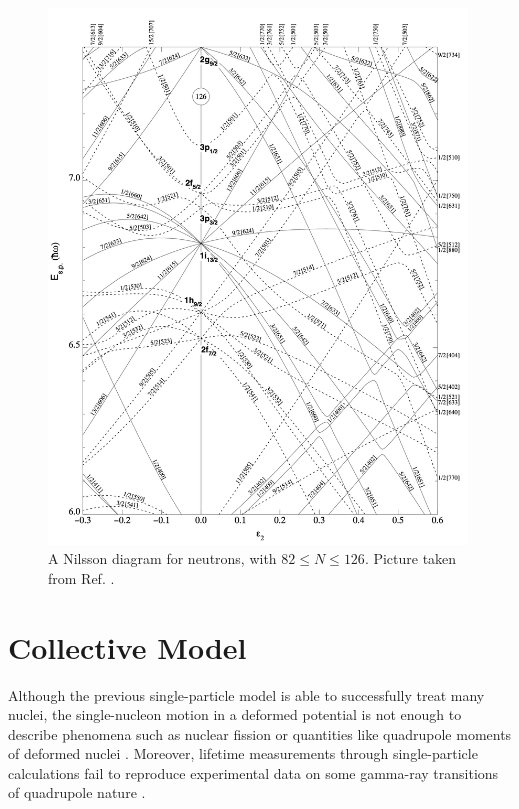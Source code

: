 \begin{figure}
    \centering
    \includegraphics[width=0.99\textwidth]{Chapters/Figures/nillson_diagram_2.png}
    \caption{A Nilsson diagram for neutrons, with $82\leq N\leq126$. Picture taken from Ref. \cite{ragnarsson2005shapes}.}
    \label{nillson-diagram-2}
\end{figure}

\pagebreak

\section{Collective Model}

Although the previous single-particle model is able to successfully treat many nuclei, the single-nucleon motion in a deformed potential is not enough to describe phenomena such as nuclear fission or quantities like quadrupole moments of deformed nuclei \cite{townes1949nuclear}. Moreover, lifetime measurements through single-particle calculations fail to reproduce experimental data on some gamma-ray transitions of quadrupole nature \cite{goldhaber1951classification}.


